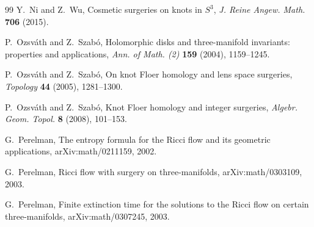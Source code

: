 \documentclass[11pt]{article}
\theoremstyle{definition}
\begin{document}
\begin{thebibliography}{99}
Y.~Ni and Z.~Wu, Cosmetic surgeries on knots in $S^3$, \emph{J. Reine Angew. Math.} \textbf{706} (2015).

P.~Ozsv\'ath and Z.~Szab\'o, Holomorphic disks and three-manifold invariants: properties and applications, \emph{Ann. of Math. (2)} \textbf{159} (2004), 1159--1245.

P.~Ozsv\'ath and Z.~Szab\'o, On knot Floer homology and lens space surgeries, \emph{Topology} \textbf{44} (2005), 1281--1300.

P.~Ozsv\'ath and Z.~Szab\'o, Knot Floer homology and integer surgeries, \emph{Algebr. Geom. Topol.} \textbf{8} (2008), 101--153.

G.~Perelman, The entropy formula for the Ricci flow and its geometric applications, arXiv:math/0211159, 2002.

G.~Perelman, Ricci flow with surgery on three-manifolds, arXiv:math/0303109, 2003.

G.~Perelman, Finite extinction time for the solutions to the Ricci flow on certain three-manifolds, arXiv:math/0307245, 2003.

\end{thebibliography}
\end{document}
